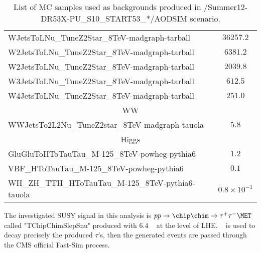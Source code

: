 \begin{table}[!Hhtb]
\begin{center}
{\begin{tabular}{|l|c|}
WJetsToLNu\_TuneZ2Star\_8TeV-madgraph-tarball          &  $36257.2$              \\
W2JetsToLNu\_TuneZ2Star\_8TeV-madgraph-tarball         &  $6381.2$               \\
W2JetsToLNu\_TuneZ2Star\_8TeV-madgraph-tarball         &  $2039.8$               \\
W3JetsToLNu\_TuneZ2Star\_8TeV-madgraph-tarball         &  $612.5$               \\
W4JetsToLNu\_TuneZ2Star\_8TeV-madgraph-tarball         &  $251.0$                \\
\hline\hline
\multicolumn{2}{|c|}{WW}\\
\hline\hline
WWJetsTo2L2Nu\_TuneZ2star\_8TeV-madgraph-tauola        &  $5.8$                \\

\hline\hline
\multicolumn{2}{|c|}{Higgs}\\
\hline\hline
GluGluToHToTauTau\_M-125\_8TeV-powheg-pythia6          &  $1.2$                \\
VBF\_HToTauTau\_M-125\_8TeV-powheg-pythia6             &  $0.1$                \\
WH\_ZH\_TTH\_HToTauTau\_M-125\_8TeV-pythia6-tauola     &  $0.8\times10^{-1}$                \\

\hline
\hline
\end{tabular}
}
\end{center}

\caption{List of MC samples used as backgrounds produced in /Summer12-DR53X-PU\_S10\_START53\_*/AODSIM scenario.}
\label{Tab.MCSamples}
\end{table}

The investigated SUSY signal in this analysis is {\small $pp \rightarrow \chip \chim \rightarrow \tau^+ \tau^- \MET$} called {\small "TChipChimSlepSnu"} produced with \PYTHIA $6.4$ ~\cite{PYTHIA} at the level of LHE. \TAUOLA ~\cite{TAUOLA} is used to decay precisely the produced $\tau$'s, then the generated events are passed through the CMS official Fast-Sim process.

